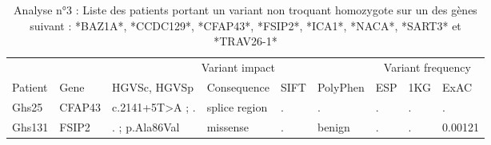 \documentclass[12pt,twoside]{reedthesis}
\theoremstyle{definition}
\theoremstyle{definition}
\theoremstyle{remark}
\begin{document}
  \begin{landscape}
  \begin{longtable}[t]{lllllllll}
  \caption{\label{tab:tabgrp2moderate}Analyse n°3 : Liste des patients portant un variant non troquant homozygote sur un des gènes suivant : *BAZ1A*, *CCDC129*, *CFAP43*, *FSIP2*, *ICA1*, *NACA*, *SART3*  et  *TRAV26-1*}\\
  \toprule
  \multicolumn{1}{c}{ } & \multicolumn{1}{c}{ } & \multicolumn{4}{c}{Variant impact} & \multicolumn{3}{c}{Variant frequency} \\
  \cmidrule(l{2pt}r{2pt}){3-6} \cmidrule(l{2pt}r{2pt}){7-9}
  Patient & Gene & HGVSc, HGVSp & Consequence & SIFT & PolyPhen & ESP & 1KG & ExAC\\
  \midrule
  Ghs25 & CFAP43 & c.2141+5T>A ; . & splice region & . & . & . & . & .\\
  Ghs131 & FSIP2 & . ; p.Ala86Val & missense & . & benign & . & . & 0.00121\\
  \bottomrule
  \end{longtable}
  \end{landscape}
  
\end{document}
